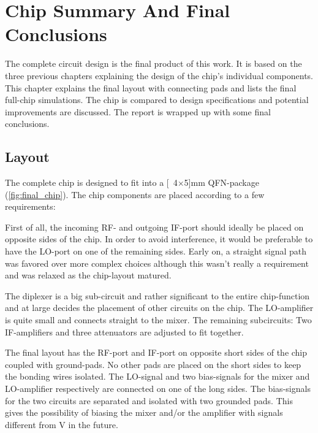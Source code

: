 \chapter{Chip Summary And Final Conclusions}
	
		The complete circuit design is the final product of this work. It is based on the three previous chapters explaining the design of the chip's individual components. This chapter explains the final layout with connecting pads and lists the final full-chip simulations. The chip is compared to design specifications and potential improvements are discussed. The report is wrapped up with some final conclusions.
		

	\section{Layout}
		The complete chip is designed to fit into a \unit[4$\times$5]{mm} QFN-package (\autoref{fig:final_chip}). The chip components are placed according to a few requirements:

		First of all, the incoming RF- and outgoing IF-port should ideally be placed on opposite sides of the chip. In order to avoid interference, it would be preferable to have the LO-port on one of the remaining sides. Early on, a straight signal path was favored over more complex choices although this wasn't really a requirement and was relaxed as the chip-layout matured. %

		The diplexer is a big sub-circuit and rather significant to the entire chip-function and at large decides the placement of other circuits on the chip. The LO-amplifier is quite small and connects straight to the mixer. The remaining subcircuits: Two IF-amplifiers and three attenuators are adjusted to fit together.

		The final layout has the RF-port and IF-port on opposite short sides of the chip coupled with ground-pads. No other pads are placed on the short sides to keep the bonding wires isolated. The LO-signal and two bias-signals for the mixer and LO-amplifier respectively are connected on one of the long sides. The bias-signals for the two circuits are separated and isolated with two grounded pads. This gives the possibility of biasing the mixer and/or the amplifier with signals different from \unit[5]{V} in the future.
	
